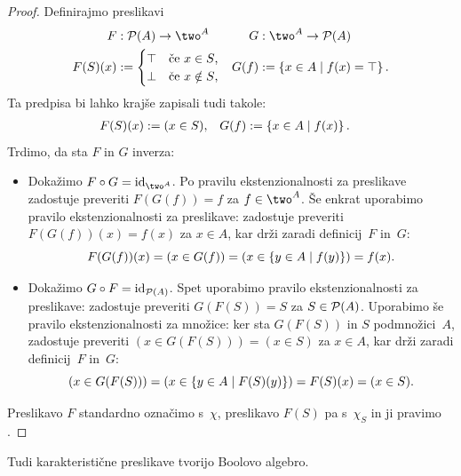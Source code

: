 \begin{proof}
  Definirajmo preslikavi
  \begin{align*}
    F &: \pow{A} \to \two^A &
    G &: \two^A \to \pow{A} \\
    F(S)(x) &\defeq
      \begin{cases}
        \top & \text{če $x \in S$,} \\
        \bot & \text{če $x \notin S$,}
      \end{cases}
    &
    G(f) &\defeq \set{x \in A \such f(x) = \top}.
  \end{align*}
  Ta predpisa bi lahko krajše zapisali tudi takole:
  \begin{align*}
  F(S)(x) &\defeq (x \in S), &
  G(f) &\defeq \set{x \in A \such f(x) }.
  \end{align*}
  Trdimo, da sta $F$ in $G$ inverza:
  \begin{itemize}
  \item 
    Dokažimo $F \circ G = \id[\two^A]$. Po pravilu ekstenzionalnosti za preslikave
    zadostuje preveriti $F(G(f)) = f$ za $f \in \two^A$.
    Še enkrat uporabimo pravilo ekstenzionalnosti za preslikave: zadostuje
    preveriti $F(G(f))(x) = f(x)$ za $x \in A$, kar drži zaradi definicij~$F$ in~$G$:
    \begin{equation*}
      F(G(f))(x) = (x \in G(f)) = (x \in \set{y \in A \such f(y)}) = f(x).
    \end{equation*}

  \item
    Dokažimo $G \circ F = \id[\pow{A}]$. Spet uporabimo pravilo ekstenzionalnosti za preslikave: zadostuje preveriti $G(F(S)) = S$ za $S \in \pow{A}$.
    Uporabimo še pravilo ekstenzionalnosti za množice: ker sta $G(F(S))$ in $S$ podmnožici~$A$, zadostuje preveriti $(x \in G(F(S))) = (x \in S)$ za $x \in A$, kar drži zaradi definicij~$F$ in~$G$:
    \begin{equation*}
      (x \in G(F(S))) = (x \in \set{y \in A \such F(S)(y)}) = F(S)(x) = (x \in S).
    \end{equation*}
  \end{itemize}
  Preslikavo $F$ standardno označimo s~$\chi$, preslikavo $F(S)$ pa s~$\chi_S$ in ji pravimo .
\end{proof}

Tudi karakteristične preslikave tvorijo Boolovo algebro.

